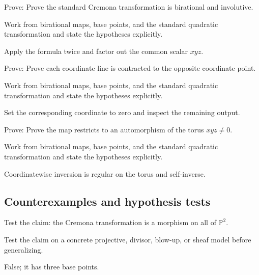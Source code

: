 \begin{exercise}[Involution]\label{exr:vi44-expand-07}
Prove: Prove the standard Cremona transformation is birational and involutive.
\end{exercise}
\begin{hint}
Work from birational maps, base points, and the standard quadratic transformation and state the hypotheses explicitly.
\end{hint}
\begin{solution}
Apply the formula twice and factor out the common scalar $xyz$.
\end{solution}

\begin{exercise}\label{exr:vi44-expand-08}
Prove: Prove each coordinate line is contracted to the opposite coordinate point.
\end{exercise}
\begin{hint}
Work from birational maps, base points, and the standard quadratic transformation and state the hypotheses explicitly.
\end{hint}
\begin{solution}
Set the corresponding coordinate to zero and inspect the remaining output.
\end{solution}

\begin{exercise}\label{exr:vi44-expand-09}
Prove: Prove the map restricts to an automorphism of the torus $xyz\ne0$.
\end{exercise}
\begin{hint}
Work from birational maps, base points, and the standard quadratic transformation and state the hypotheses explicitly.
\end{hint}
\begin{solution}
Coordinatewise inversion is regular on the torus and self-inverse.
\end{solution}

\subsection*{Counterexamples and hypothesis tests}

\begin{exercise}\label{exr:vi44-expand-10}
Test the claim: the Cremona transformation is a morphism on all of $\mathbb P^2$.
\end{exercise}
\begin{hint}
Test the claim on a concrete projective, divisor, blow-up, or sheaf model before generalizing.
\end{hint}
\begin{solution}
False; it has three base points.
\end{solution}

